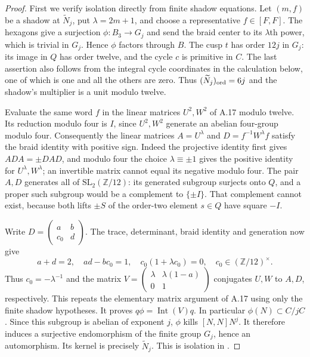 \begin{proof}
First we verify isolation directly from finite shadow equations.
Let $(m,f)$ be a shadow at $\widetilde N_j$, put
$\lambda=2m+1$, and choose a representative $f\in[F,F]$.
The hexagons give a surjection $\phi:B_3\to G_j$ and send
the braid center to its $\lambda$th power, which is trivial
in $G_j$. Hence $\phi$ factors through $B$.
The cusp $t$ has order $12j$ in $G_j$: its image in $Q$ has
order twelve, and the cycle $c$ is primitive in $C$.
The last assertion also follows from the integral cycle
coordinates in the calculation below, one of which is one
and all the others are zero. Thus
$(\widetilde N_j)_{\rm ord}=6j$ and the shadow's multiplier
is a unit modulo twelve.

Evaluate the same word $f$ in the linear matrices $U^2,W^2$
of A.17 modulo twelve. Its reduction modulo four is $I$,
since $U^2,W^2$ generate an abelian four-group modulo four.
Consequently the linear matrices
$A=U^\lambda$ and $D=f^{-1}W^\lambda f$ satisfy the braid
identity with positive sign. Indeed the projective identity
first gives $ADA=\pm DAD$, and modulo four the choice
$\lambda\equiv\pm1$ gives the positive identity for
$U^\lambda,W^\lambda$; an invertible matrix cannot equal
its negative modulo four. The pair $A,D$ generates all of
$\mathrm{SL}_2(\mathbb Z/12)$: its generated subgroup
surjects onto $Q$, and a proper such subgroup would be a
complement to $\{\pm I\}$. That complement cannot exist,
because both lifts $\pm S$ of the order-two element $s\in Q$
have square $-I$.

Write $D=(\begin{smallmatrix}a&b\\c_0&d\end{smallmatrix})$.
The trace, determinant, braid identity and generation now give
\[
 a+d=2,\quad ad-bc_0=1,\quad
 c_0(1+\lambda c_0)=0,\quad c_0\in(\mathbb Z/12)^\times.
\]
Thus $c_0=-\lambda^{-1}$ and the matrix
$V=(\begin{smallmatrix}\lambda&\lambda(1-a)\\0&1\end{smallmatrix})$
conjugates $U,W$ to $A,D$, respectively. This repeats the
elementary matrix argument of A.17 using only the finite
shadow hypotheses. It proves $q\phi=\operatorname{Int}(V)q$.
In particular $\phi(N)\subset C/jC$. Since this subgroup
is abelian of exponent $j$, $\phi$ kills $[N,N]N^j$.
It therefore induces a surjective endomorphism of the finite
group $G_j$, hence an automorphism. Its kernel is precisely
$\widetilde N_j$. This is isolation in
\cite[Definition3.13]{dDolgushevGuynee2024}.


\end{proof}
